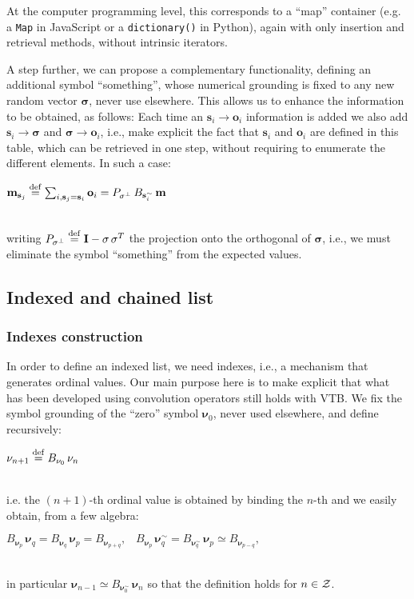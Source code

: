 \documentclass[sn-mathphys]{sn-jnl}
\newcommand{\defq}{\stackrel {\rm def}{=}}
\newcommand{\eqline}[1]{~\vspace{0.1cm}\\\centerline{$#1$}\vspace{0.1cm}\\}
\begin{document}
At the computer programming level, this corresponds to a ``map'' container (e.g. a {\tt Map} in JavaScript or a {\tt dictionary()} in Python), again with only insertion and retrieval methods, without intrinsic iterators.

A step further, we can propose a complementary functionality, defining an additional symbol ``something'', whose numerical grounding is fixed to any new random vector $\mathbf{\sigma}$, never use elsewhere. This allows us to enhance the information to be obtained, as follows: Each time an $\mathbf{s}_i \rightarrow \mathbf{o}_i$ information is added we also add $\mathbf{s}_i \rightarrow \mathbf{\sigma}$  and $\mathbf{\sigma} \rightarrow \mathbf{o}_i$, i.e., make explicit the fact that $\mathbf{s}_i$ and $\mathbf{o}_i$ are defined in this table, which can be retrieved in one step, without requiring to enumerate the different elements. In such a case:
\eqline{\mathbf{m}_{\mathbf{s}_j} \defq \sum_{i, \mathbf{s}_j = \mathbf{s}_i} \mathbf{o}_i = P_{\mathbf{\sigma}^\perp} \,  B_{\mathbf{s}_i^\sim} \, \mathbf{m}}
writing $P_{\mathbf{\sigma}^\perp} \defq \mathbf{I} - \mathbf{\sigma} \, \mathbf{\sigma}^T$ the projection onto the orthogonal of $\mathbf{\sigma}$, i.e., we must eliminate the symbol ``something'' from the expected values.

\subsection{Indexed and chained list}

\subsubsection{Indexes construction}

In order to define an indexed list, we need indexes, i.e., a mechanism that generates ordinal values. Our main purpose here is to make explicit that what has been developed using convolution operators \cite{komer_neural_2019} still holds with VTB. We fix the symbol grounding of the ``zero'' symbol $\mathbf{\nu}_0$, never used elsewhere, and define recursively:
\eqline{\mathbf{\nu}_{n + 1} \defq B_{\mathbf{\nu}_0} \, \mathbf{\nu}_n}
i.e. the $(n+1)$-th ordinal value is obtained by binding the $n$-th and we easily obtain, from a few algebra:
\eqline{B_{\mathbf{\nu}_p} \, \mathbf{\nu}_q = B_{\mathbf{\nu}_q} \, \mathbf{\nu}_p = B_{\mathbf{\nu}_{p+q}}, \;\;\; 
B_{\mathbf{\nu}_p} \, \mathbf{\nu}_q^\sim = B_{\mathbf{\nu}_q^\sim} \, \mathbf{\nu}_p  \simeq B_{\mathbf{\nu}_{p-q}},}
in particular $\mathbf{\nu}_{n - 1} \simeq B_{\mathbf{\nu}_0^\sim} \, \mathbf{\nu}_n$ so that the definition
holds for $n \in {\cal Z}$.
\end{document}
